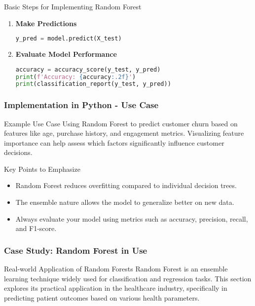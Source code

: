 \documentclass[aspectratio=169]{beamer}
\begin{document}
\begin{frame}[fragile]
\begin{block}{Basic Steps for Implementing Random Forest}
\begin{enumerate}
            \item \textbf{Make Predictions}
            \begin{lstlisting}[language=Python]
y_pred = model.predict(X_test)
            \end{lstlisting}

            \item \textbf{Evaluate Model Performance}
            \begin{lstlisting}[language=Python]
accuracy = accuracy_score(y_test, y_pred)
print(f'Accuracy: {accuracy:.2f}')
print(classification_report(y_test, y_pred))
            \end{lstlisting}
        \end{enumerate}
    \end{block}
\end{frame}

\begin{frame}[fragile]
    \frametitle{Implementation in Python - Use Case}
    \begin{block}{Example Use Case}
        Using Random Forest to predict customer churn based on features like age, purchase history, and engagement metrics. Visualizing feature importance can help assess which factors significantly influence customer decisions.
    \end{block}

    \begin{block}{Key Points to Emphasize}
        \begin{itemize}
            \item Random Forest reduces overfitting compared to individual decision trees.
            \item The ensemble nature allows the model to generalize better on new data.
            \item Always evaluate your model using metrics such as accuracy, precision, recall, and F1-score.
        \end{itemize}
    \end{block}
\end{frame}

\begin{frame}
    \frametitle{Case Study: Random Forest in Use}
    \begin{block}{Real-world Application of Random Forests}
        Random Forest is an ensemble learning technique widely used for classification and regression tasks. This section explores its practical application in the healthcare industry, specifically in predicting patient outcomes based on various health parameters.
    \end{block}
\end{frame}
\end{document}
